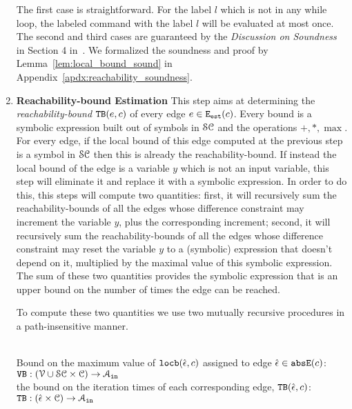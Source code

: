 \begin{enumerate}
  The first case is straightforward. 
  For the label $l$ which is not in any while loop, 
  the labeled command with the label $l$ will be 
  evaluated at most once. 
  The second and third cases are guaranteed by the \emph{Discussion on Soundness} in Section 4 in~\cite{sinn2017complexity}.
  We formalized the soundness and proof by Lemma~\ref{lem:local_bound_sound} in Appendix~\ref{apdx:reachability_soundness}.
\item \textbf{Reachability-bound Estimation}
This step aims at determining the \emph{reachability-bound} ${\mathtt{TB}}(e, c)$ of every edge $e\in \mathtt{{E_{est}}}(c)$.
Every bound is a symbolic expression built out of symbols in $\mathcal{SC}$ and the operations $+, *, \max$.
For every edge, if the local bound of this edge computed at the previous step is a symbol in $\mathcal{SC}$ then this is already the reachability-bound. 
If instead the local bound of the edge is a variable $y$ which is not an input variable, this step will eliminate it and replace it with a symbolic expression.
In order to do this, this steps will compute two quantities: first, it will recursively sum the reachability-bounds of all the edges whose difference constraint may increment the variable $y$, plus the corresponding increment;
second, it will recursively sum the reachability-bounds of all the edges whose difference constraint may reset the variable $y$ to a (symbolic) expression that doesn't depend on it, multiplied by the maximal value of this symbolic expression. The sum of these two quantities provides the symbolic expression that is an upper bound on the number of times the edge can be reached.

To compute these two quantities we use two mutually recursive procedures in a path-insensitive manner.

\\ 
Bound on the maximum value of $\mathtt{locb}(\hat{\mathtt{\epsilon}{}}, c)$ assigned to edge $\hat{\mathtt{\epsilon}{}} \in \mathtt{abs}{\mathtt{E}}(c)$:
$ {\mathtt{VB}}: (\mathcal{V} \cup \mathcal{SC}  \times \mathcal{C}) \to \mathcal{A}_{\mathtt{in}}$
\\
the bound on the iteration times of each corresponding edge, ${\mathtt{TB}}(\hat{\mathtt{\epsilon}{}}, c)$:
${\mathtt{TB}}: (\hat{\mathtt{\epsilon}{}} \times \mathcal{C}) \to \mathcal{A}_{\mathtt{in}}$



\end{enumerate}
